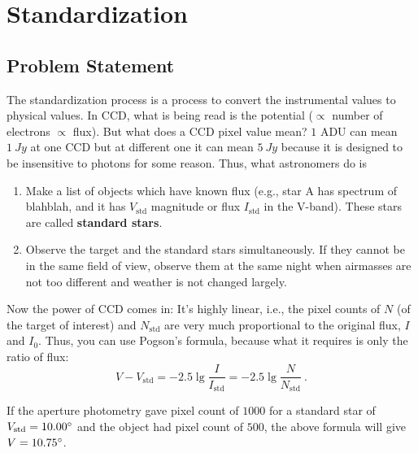\chapter{Standardization}

\section{Problem Statement}
The standardization process is a process to convert the instrumental values to physical values. In CCD, what is being read is the potential ($ \propto $ number of electrons $ \propto $ flux). But what does a CCD pixel value mean? $ 1 $ ADU can mean $ \SI{1}{Jy} $ at one CCD but at different one it can mean $ \SI{5}{Jy} $ because it is designed to be insensitive to photons for some reason. Thus, what astronomers do is

\begin{enumerate}
\item Make a list of objects which have known flux (e.g., star A has spectrum of blahblah, and it has $ V_\mathrm{std} $ magnitude or flux $ I_\mathrm{std} $ in the V-band). These stars are called \textbf{standard stars}.
\item Observe the target and the standard stars simultaneously. If they cannot be in the same field of view, observe them at the same night when airmasses are not too different and weather is not changed largely.
\end{enumerate}
Now the power of CCD comes in: It's highly linear, i.e., the pixel counts of $ N $ (of the target of interest) and $ N_\mathrm{std} $ are very much proportional to the original flux, $ I $ and $ I_0 $. Thus, you can use Pogson's formula, because what it requires is only the ratio of flux: 
\begin{equation}\label{eq: Pogson}
  V - V_\mathrm{std} 
    = -2.5 \lg \frac{I}{I_\mathrm{std}} 
    =  -2.5 \lg \frac{N}{N_\mathrm{std}} ~.
\end{equation}

\begin{ex}
If the aperture photometry gave pixel count of $ 1000 $ for a standard star of $ V_\mathrm{std} = \m{10.00} $ and the object had pixel count of $ 500 $, the above formula will give $ V = \m{10.75} $. 
\end{ex}

